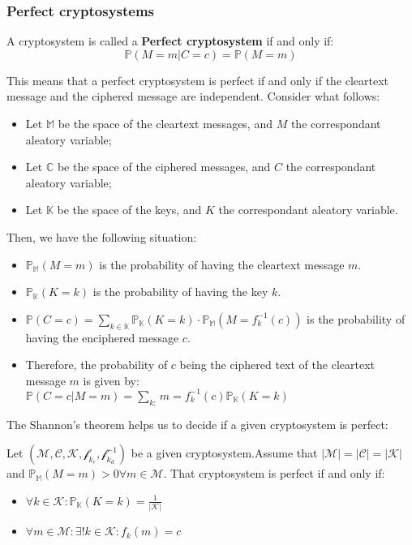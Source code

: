 \subsubsection{Perfect cryptosystems}
\begin{definition}
    A cryptosystem is called a \textbf{Perfect cryptosystem} if and only if:
    \[\mathbb{P}(M = m|C = c) = \mathbb{P}(M = m)\]
\end{definition}
This means that a perfect cryptosystem is perfect if and only if the cleartext message and the ciphered message are independent.\newline
Consider what follows:
\begin{itemize}
    \item Let $\mathbb{M}$ be the space of the cleartext messages, and $M$ the correspondant aleatory variable;
    \item Let $\mathbb{C}$ be the space of the ciphered messages, and $C$ the correspondant aleatory variable;
    \item Let $\mathbb{K}$ be the space of the keys, and $K$ the correspondant aleatory variable.
\end{itemize}
Then, we have the following situation:
\begin{itemize}
    \item $\mathbb{P}_{\mathbb{M}}(M = m)$ is the probability of having the cleartext message $m$.
    \item $\mathbb{P}_{\mathbb{K}}(K = k)$ is the probability of having the key $k$.
    \item $\mathbb{P}(C = c) = \sum_{k \in \mathbb{K}} \mathbb{P}_{\mathbb{K}}(K = k) \cdot \mathbb{P}_{\mathbb{M}}(M = f_{k}^{-1}(c))$ is the probability of having the enciphered message $c$.
    \item Therefore, the probability of $c$ being the ciphered text of the cleartext message $m$ is given by:\\
    $\mathbb{P}(C = c|M = m) = \sum_{k : } m = f_{k}^{-1}(c) \mathbb{P}_{\mathbb{K}}(K = k)$
\end{itemize}
The Shannon's theorem helps us to decide if a given cryptosystem is perfect:
\begin{theorem}
    Let $(\mathcal{M},\mathcal{C}, \mathcal{K}, \mathscr{f}_{k_{e}},\mathscr{f}_{k_{d}}^{-1})$ be a given cryptosystem.\newline Assume that $|\mathcal{M}| = |\mathcal{C}| = |\mathcal{K}|$ and $\mathbb{P}_{\mathbb{M}}(M = m) > 0 \forall m \in \mathcal{M}$. \newline
    That cryptosystem is perfect if and only if:
    \begin{itemize}
        \item $\forall k \in \mathcal{K}: \mathbb{P}_{\mathbb{K}}(K = k) = \frac{1}{|\mathcal{K}|}$
        \item $\forall m \in \mathcal{M}: \exists ! k \in \mathcal{K}: f_{k}(m) = c$
    \end{itemize}
\end{theorem}

